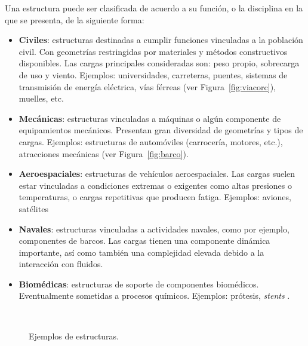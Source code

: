 Una estructura puede ser clasificada de acuerdo a su función, o la disciplina en la que se presenta, de la siguiente forma:
%
\begin{itemize}
  \item \textbf{Civiles}: estructuras destinadas a cumplir funciones vinculadas a la población civil. %
  Con geometrías restringidas por materiales y métodos constructivos disponibles. %
  Las cargas principales consideradas son: peso propio, sobrecarga de uso y viento. Ejemplos: universidades, carreteras, puentes, sistemas de transmisión de energía eléctrica, vías férreas (ver Figura~\ref{fig:viacorc}), muelles, etc.
  \item \textbf{Mecánicas}: estructuras vinculadas a máquinas o algún componente de equipamientos mecánicos. Presentan gran diversidad de geometrías y tipos de cargas. Ejemplos: estructuras de automóviles (carrocería, motores, etc.), atracciones mecánicas (ver Figura~\ref{fig:barco}).
  \item \textbf{Aeroespaciales}: estructuras de vehículos aeroespaciales. Las cargas suelen estar vinculadas a condiciones extremas o exigentes como altas presiones o temperaturas, o cargas repetitivas que producen fatiga. Ejemplos: aviones, satélites \citep{Yoshiaki1992}
  \item \textbf{Navales}: estructuras vinculadas a actividades navales, como por ejemplo, componentes de barcos. Las cargas tienen una componente dinámica importante, así como también una complejidad elevada debido a la interacción con fluidos.
  \item \textbf{Biomédicas}: estructuras de soporte de componentes biomédicos. Eventualmente sometidas a procesos químicos. Ejemplos: prótesis, \textit{stents} \citep{Frischkorn2015}.
\end{itemize}

\begin{figure}[htb]
	\centering
{}
~
\caption{Ejemplos de estructuras.}
	\label{fig:ejsestr}
\end{figure}


